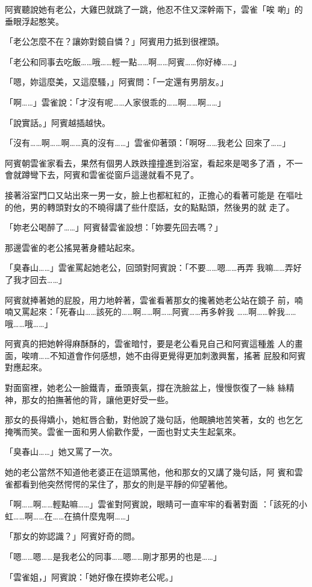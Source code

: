 阿賓聽說她有老公，大雞巴就跳了一跳，他忍不住又深幹兩下，雲雀「唉
喲」的垂眼浮起憨笑。

「老公怎麼不在？讓妳對鏡自憐？」阿賓用力抵到很裡頭。

「老公和同事去吃飯……哦……輕一點……啊……阿賓……你好棒……」

「嗯，妳這麼美，又這麼騷，」阿賓問：「一定還有男朋友。」

「啊……」雲雀說：「才沒有呢……人家很乖的……啊……啊……」

「說實話。」阿賓越插越快。

「沒有……啊……啊……真的沒有……」雲雀仰著頭：「啊呀……我老公
回來了……」

阿賓朝雲雀家看去，果然有個男人跌跌撞撞進到浴室，看起來是喝多了酒
，不一會就蹲彎下去，阿賓和雲雀從窗戶這邊就看不見了。

接著浴室門口又站出來一男一女，臉上也都紅紅的，正擔心的看著可能是
在嘔吐的他，男的轉頭對女的不曉得講了些什麼話，女的點點頭，然後男的就
走了。

「妳老公喝醉了……」阿賓替雲雀設想：「妳要先回去嗎？」

那邊雲雀的老公搖晃著身體站起來。

「臭春山……」雲雀罵起她老公，回頭對阿賓說：「不要……嗯……再弄
我嘛……弄好了我才回去……」

阿賓就捧著她的屁股，用力地幹著，雲雀看著那女的攙著她老公站在鏡子
前，喃喃又罵起來：「死春山……該死的……啊……啊……阿賓……再多幹我
……啊……幹我……哦……哦……」

阿賓真的把她幹得麻酥酥的，雲雀暗忖，要是老公看見自己和阿賓這種羞
人的畫面，唉唷……不知道會作何感想，她不由得更覺得更加刺激興奮，搖著
屁股和阿賓對應起來。

對面窗裡，她老公一臉鐵青，垂頭喪氣，撐在洗臉盆上，慢慢恢復了一絲
絲精神，那女的拍撫著他的背，讓他更好受一些。

那女的長得嬌小，她紅唇合動，對他說了幾句話，他靦腆地苦笑著，女的
也乞乞掩嘴而笑。雲雀一面和男人偷歡作愛，一面也對丈夫生起氣來。

「臭春山……」她又罵了一次。

她的老公當然不知道他老婆正在這頭罵他，他和那女的又講了幾句話，阿
賓和雲雀都看到他突然愕愕的呆住了，那女的則是平靜的仰望著他。

「啊……啊……輕點嘛……」雲雀對阿賓說，眼睛可一直牢牢的看著對面
：「該死的小虹……啊……在……在搞什麼鬼啊……」

「那女的妳認識？」阿賓好奇的問。

「嗯……嗯……是我老公的同事……嗯……剛才那男的也是……」

「雲雀姐，」阿賓說：「她好像在摸妳老公呢。」

